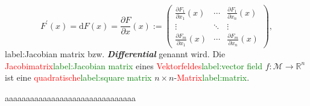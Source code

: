 \documentclass[a4paper,twoside,english,ngerman,deutsch,german,sectrefs,envcountsame,envcountchap]{svmono}
\newcommand{\setref}[2]{\textcolor{red}{#1}\textcolor{green}{#2}}
\begin{document}
\begin{equation}
F^{\prime}(x)={\mathrm{d}} F(x)=\frac{\partial F}{\partial x}(x):=\left(\begin{array}{ccc}
\frac{\partial F_{1}}{\partial x_{1}}(x) & \cdots & \frac{\partial F_{1}}{\partial x_{n}}(x)\\
\vdots & \ddots & \vdots\\
\frac{\partial F_{m}}{\partial x_{1}}(x) & \cdots & \frac{\partial F_{m}}{\partial x_{n}}(x)
\end{array}\right),\label{eq:dF}
\end{equation}
{label:Jacobian matrix} bzw. \textbf{\em Differential} genannt wird. Die \setref{Jacobimatrix}{label:Jacobian matrix} eines \setref{Vektorfeldes}{label:vector field} $f:\mathcal{M}\to{\mathbb{R}}^{n}$ ist eine \setref{quadratische}{label:square matrix} $n\times n$-\setref{Matrix}{label:matrix}.

aaaaaaaaaaaaaaaaaaaaaaaaaaaaaaa


\end{document}
